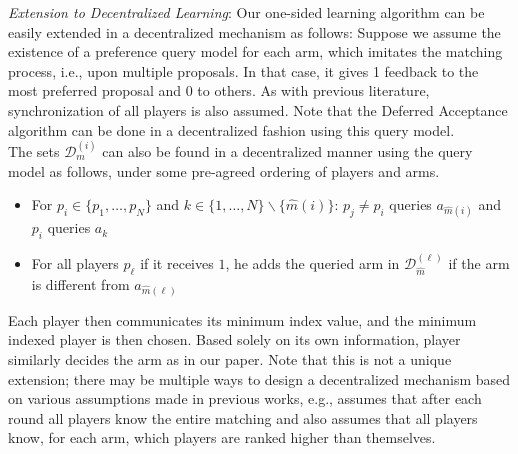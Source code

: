 \documentclass{article}
\begin{document}
\textit{Extension to Decentralized Learning}: Our one-sided learning algorithm can be easily extended in a decentralized mechanism as follows: Suppose we assume the existence of a preference query model for each arm, which imitates the matching process, i.e., upon multiple proposals. In that case, it gives 1 feedback to the most preferred proposal and 0 to others. As with previous literature, synchronization of all players is also assumed. Note that the Deferred Acceptance algorithm can be done in a decentralized fashion using this query model. \\
    The sets $\mathcal{D}^{(i)}_m$ can also be found in a decentralized manner using the query model as follows, under some pre-agreed ordering of players and arms. 
    \begin{itemize}[leftmargin=*, nosep,noitemsep, topsep=0pt]
        \item For $p_i\in\{p_1,\ldots,p_N\}$ and $k\in \{1,\ldots,N\}\backslash\{
    \hat{m}(i)\}$: $p_j\neq p_i$ queries $a_{\hat{m}(i)}$ and $p_i$ queries $a_k$
    \item For all players $p_{\ell}$ if it receives $1$, he adds the queried arm in $\mathcal{D}^{(\ell)}_{\hat{m}}$ if the arm is different from $a_{\hat{m}(\ell)}$
    \end{itemize}
Each player then communicates its minimum index value, and the minimum indexed player is then chosen. Based solely on its own information, player similarly decides the arm as in our paper. Note that this is not a unique extension; there may be multiple ways to design a decentralized mechanism based on various assumptions made in previous works, e.g., \cite{liu2021decentralized} assumes that after each round all players know the entire matching and also assumes that all players know, for each arm, which players are ranked higher than themselves.
\end{document}
